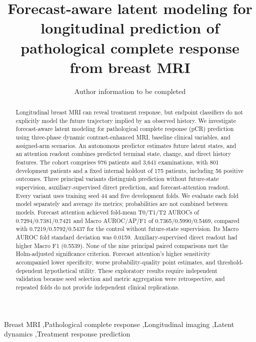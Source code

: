 \documentclass[5p,twocolumn,authoryear]{elsarticle}
\begin{document}
\begin{frontmatter}
\title{Forecast-aware latent modeling for longitudinal prediction of pathological complete response from breast MRI}
\author{Author information to be completed}
\address{Affiliations and corresponding author to be completed}
\begin{abstract}
Longitudinal breast MRI can reveal treatment response, but endpoint classifiers do not explicitly model the future trajectory implied by an observed history. We investigate forecast-aware latent modeling for pathological complete response (pCR) prediction using three-phase dynamic contrast-enhanced MRI, baseline clinical variables, and assigned-arm scenarios. An autonomous predictor estimates future latent states, and an attention readout combines predicted terminal state, change, and direct history features. The cohort comprises 976 patients and 3,641 examinations, with 801 development patients and a fixed internal holdout of 175 patients, including 56 positive outcomes. Three principal variants distinguish prediction without future-state supervision, auxiliary-supervised direct prediction, and forecast-attention readout. Every variant uses training seed 44 and five development folds. We evaluate each fold model separately and average its metrics; probabilities are not combined between models. Forecast attention achieved fold-mean T0/T1/T2 AUROCs of 0.7294/0.7381/0.7421 and Macro AUROC/AP/F1 of 0.7365/0.5990/0.5469, compared with 0.7219/0.5792/0.5437 for the control without future-state supervision. Its Macro AUROC fold standard deviation was 0.0159. Auxiliary-supervised direct readout had higher Macro F1 (0.5539). None of the nine principal paired comparisons met the Holm-adjusted significance criterion. Forecast attention's higher sensitivity accompanied lower specificity, worse probability-quality point estimates, and threshold-dependent hypothetical utility. These exploratory results require independent validation because seed selection and metric aggregation were retrospective, and repeated folds do not provide independent clinical replications.
\end{abstract}
\begin{keyword}
Breast MRI \sep Pathological complete response \sep Longitudinal imaging \sep Latent dynamics \sep Treatment response prediction
\end{keyword}
\end{frontmatter}








\end{document}
